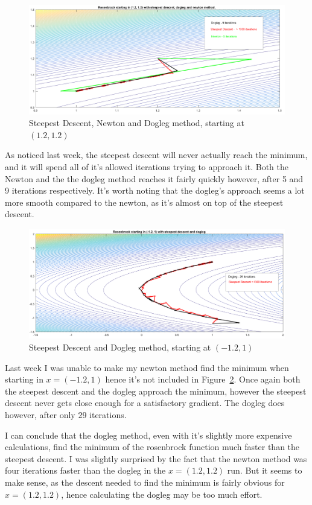 \documentclass[11pt]{article} %
\begin{document}
\begin{figure}[H]
    \centering
    \includegraphics[width=1\textwidth]{12_12_mixed}
    \caption{Steepest Descent, Newton and Dogleg method, starting at $(1.2, 1.2)$}
    \label{fig:dogleg1}
\end{figure}
As noticed last week, the steepest descent will never actually reach the minimum, and it will spend all of it's allowed iterations trying to approach it. Both the Newton and the the dogleg method reaches it fairly quickly however, after 5 and 9 iterations respectively. It's worth noting that the dogleg's approach seems a lot more smooth compared to the newton, as it's almost on top of the steepest descent.

\begin{figure}[H]
    \centering
    \includegraphics[width=1\textwidth]{-12_1_mixed}
    \caption{Steepest Descent and Dogleg method, starting at $(-1.2, 1)$}
    \label{fig:dogleg2}
\end{figure}
Last week I was unable to make my newton method find the minimum when starting in $x=(-1.2, 1)$ hence it's not included in Figure~\ref{fig:dogleg2}. Once again both the steepest descent and the dogleg approach the minimum, however the steepest descent never gets close enough for a satisfactory gradient. The dogleg does however, after only 29 iterations.

I can conclude that the dogleg method, even with it's slightly more expensive calculations, find the minimum of the rosenbrock function much faster than the steepest descent. I was slightly surprised by the fact that the newton method was four iterations faster than the dogleg in the $x=(1.2, 1.2)$ run. But it seems to make sense, as the descent needed to find the minimum is fairly obvious for $x=(1.2, 1.2)$, hence calculating the dogleg may be too much effort. 
\end{document}
